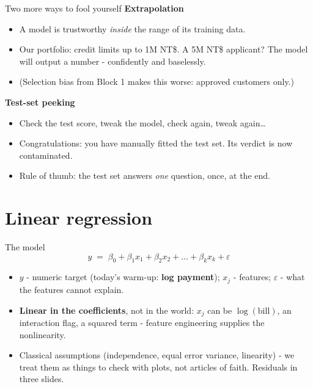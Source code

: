 \documentclass[10pt,aspectratio=169]{beamer}
\begin{document}
\begin{frame}{Two more ways to fool yourself}
  \textbf{Extrapolation}
  \begin{itemize}\small
    \item A model is trustworthy \emph{inside} the range of its training data.
    \item Our portfolio: credit limits up to 1M NT\$. A 5M NT\$ applicant?
          The model will output a number - \alert{confidently and baselessly}.
    \item (Selection bias from Block 1 makes this worse: approved customers
          only.)
  \end{itemize}
  \vspace{0.5em}
  \textbf{Test-set peeking}
  \begin{itemize}\small
    \item Check the test score, tweak the model, check again, tweak again\ldots
    \item Congratulations: you have manually fitted the test set. Its verdict
          is now \alert{contaminated}.
    \item Rule of thumb: the test set answers \emph{one} question, once,
          at the end.
  \end{itemize}
\end{frame}

\section{Linear regression}

\begin{frame}{The model}
  \[
    y \;=\; \beta_0 + \beta_1 x_1 + \beta_2 x_2 + \dots + \beta_k x_k + \varepsilon
  \]
  \begin{itemize}\small
    \item $y$ - numeric target (today's warm-up: \textbf{log payment});
          $x_j$ - features; $\varepsilon$ - what the features cannot explain.
    \item \textbf{Linear in the coefficients}, not in the world: $x_j$ can be
          $\log(\text{bill})$, an interaction flag, a squared term -
          feature engineering supplies the nonlinearity.
    \item Classical assumptions (independence, equal error variance,
          linearity) - we treat them as \alert{things to check with plots},
          not articles of faith. Residuals in three slides.
  \end{itemize}
\end{frame}
\end{document}

